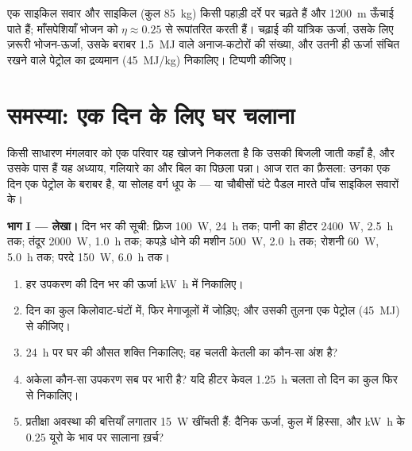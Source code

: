 \begin{exercise}[$\star\star\star$]\label{exo:g10:energy-conservation:15}
एक साइकिल सवार और साइकिल (कुल \qty{85}{kg}) किसी पहाड़ी दर्रे पर चढ़ते हैं और
\qty{1200}{m} ऊँचाई पाते हैं; माँसपेशियाँ भोजन को $\eta \approx 0.25$ से रूपांतरित करती
हैं। चढ़ाई की यांत्रिक ऊर्जा, उसके लिए ज़रूरी भोजन-ऊर्जा,
उसके बराबर \qty{1.5}{MJ} वाले अनाज-कटोरों की संख्या, और उतनी ही ऊर्जा
संचित रखने वाले पेट्रोल का द्रव्यमान (\qty{45}{MJ/kg}) निकालिए। टिप्पणी कीजिए।
\end{exercise}

\section{समस्या: एक दिन के लिए घर चलाना}

\begin{problem}
\label{pb:g10:energy-conservation:1}
किसी साधारण मंगलवार को एक परिवार यह खोजने निकलता है कि उसकी बिजली जाती
कहाँ है, और उसके पास हैं यह अध्याय, गलियारे का  और बिल का पिछला
पन्ना। आज रात का फ़ैसला: उनका एक दिन एक  पेट्रोल के
बराबर है, या सोलह वर्ग  धूप के --- या चौबीसों घंटे पैडल
मारते पाँच साइकिल सवारों के।

\medskip
\noindent\textbf{भाग I --- लेखा।}
दिन भर की सूची: फ़्रिज \qty{100}{W}, \qty{24}{h} तक; पानी का हीटर \qty{2400}{W},
\qty{2.5}{h} तक; तंदूर \qty{2000}{W}, \qty{1.0}{h} तक; कपड़े धोने की मशीन \qty{500}{W},
\qty{2.0}{h} तक; रोशनी \qty{60}{W}, \qty{5.0}{h} तक; परदे \qty{150}{W}, \qty{6.0}{h} तक।
\begin{enumerate}
  \item हर उपकरण की दिन भर की ऊर्जा \unit{kW.h} में निकालिए।
  \item दिन का कुल किलोवाट-घंटों में, फिर मेगाजूलों में जोड़िए;
        और उसकी तुलना एक  पेट्रोल (\qty{45}{MJ}) से कीजिए।
  \item \qty{24}{h} पर घर की औसत शक्ति निकालिए; वह चलती केतली का
        कौन-सा अंश है?
  \item अकेला कौन-सा उपकरण सब पर भारी है? यदि हीटर केवल \qty{1.25}{h} चलता तो
        दिन का कुल फिर से निकालिए।
  \item प्रतीक्षा अवस्था की बत्तियाँ लगातार \qty{15}{W} खींचती हैं: दैनिक
        ऊर्जा, कुल में हिस्सा, और \unit{kW.h} के $0.25$ यूरो के
        भाव पर सालाना ख़र्च?
\end{enumerate}


\end{problem}
